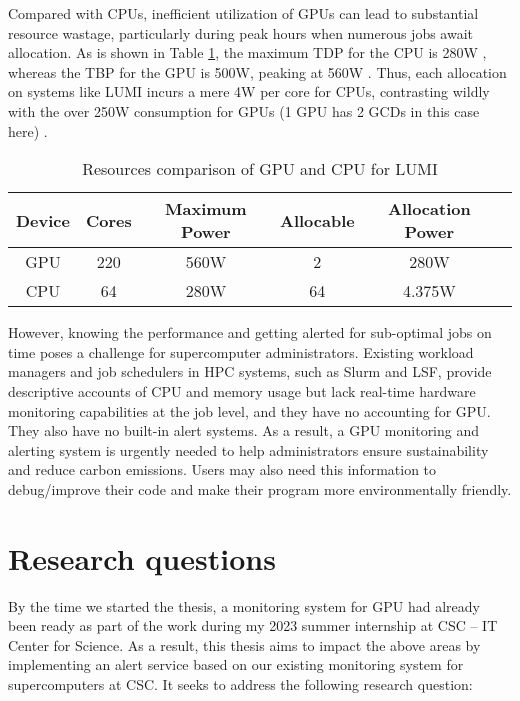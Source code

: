 Compared with CPUs, inefficient utilization of GPUs can lead to substantial resource wastage, particularly during peak hours when numerous jobs await allocation. As is shown in Table \ref{tab:lumi_resources}, the maximum TDP for the CPU is 280W \cite{amd-epyc-cpu}, whereas the TBP for the GPU is 500W, peaking at 560W \cite{amd-mi250x}. Thus, each allocation on systems like LUMI incurs a mere 4W per core for CPUs, contrasting wildly with the over 250W consumption for GPUs (1 GPU has 2 GCDs in this case here) \cite{lumi}.

\begin{table}[H]
    \centering
    \begin{tabular}{|c|c|c|c|c|c|}
        \hline
        Device & Cores & Maximum Power & Allocable & Allocation Power \\
        \hline
        GPU & 220 & 560W & 2 & 280W \\
        \hline
        CPU & 64 & 280W & 64 & 4.375W \\
        \hline
    \end{tabular}
    \caption{Resources comparison of GPU and CPU for LUMI}
    \label{tab:lumi_resources}
\end{table}

However, knowing the performance and getting alerted for sub-optimal jobs on time poses a challenge for supercomputer administrators. Existing workload managers and job schedulers in HPC systems, such as Slurm and LSF, provide descriptive accounts of CPU and memory usage but lack real-time hardware monitoring capabilities at the job level, and they have no accounting for GPU. They also have no built-in alert systems. As a result, a GPU monitoring and alerting system is urgently needed to help administrators ensure sustainability and reduce carbon emissions. Users may also need this information to debug/improve their code and make their program more environmentally friendly.

\section{Research questions}

By the time we started the thesis, a monitoring system for GPU had already been ready as part of the work during my 2023 summer internship at CSC -- IT Center for Science. As a result, this thesis aims to impact the above areas by implementing an alert service based on our existing monitoring system for supercomputers at CSC. It seeks to address the following research question:

